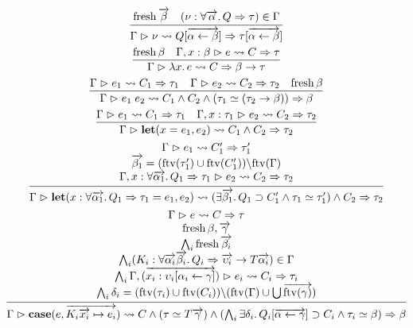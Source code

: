 \begin{gather*}
  \infer{\Gamma \vrhd \nu \elab Q[\overrightarrow{\alpha \assign \beta}] \Rightarrow \tau[\overrightarrow{\alpha \assign \beta}]}{
    \symfresh \overrightarrow{\beta}
    &
    (\nu: \forall \overrightarrow{\alpha}\ldotp Q \Rightarrow \tau) \in \Gamma
  }
  \\
  \infer{\Gamma \vrhd \lambda x\ldotp e \elab C \Rightarrow \beta \to \tau}{
    \symfresh \beta
    &
    \Gamma,x:\beta \vrhd e \elab C \Rightarrow \tau
  }
  \\
  \infer{\Gamma \vrhd e_1\; e_2 \elab C_1 \land C_2 \land (\tau_1 \simeq (\tau_2 \to \beta)) \Rightarrow \beta}{
    \Gamma \vrhd e_1 \elab C_1 \Rightarrow \tau_1
    &
    \Gamma \vrhd e_2 \elab C_2 \Rightarrow \tau_2
    &
    \symfresh \beta
  }
  \\
  \infer{\Gamma \vrhd \mathbf{let}(x = e_1, e_2) \elab C_1 \land C_2 \Rightarrow \tau_2}{
    \Gamma \vrhd e_1 \elab C_1 \Rightarrow \tau_1
    &
    \Gamma, x: \tau_1 \vrhd e_2 \elab C_2 \Rightarrow \tau_2
  }
  \\
  \infer{\Gamma \vrhd \mathbf{let}(x: \forall \overrightarrow{\alpha_1}\ldotp Q_1 \Rightarrow \tau_1 = e_1, e_2) \elab (\exists \overrightarrow{\beta_1}\ldotp Q_1 \supset C_1' \land \tau_1 \simeq \tau_1') \land C_2 \Rightarrow \tau_2}{
    \begin{array}{c}
      \Gamma \vrhd e_1 \elab C_1' \Rightarrow \tau_1' \\
      \overrightarrow{\beta_1} = (\mathrm{ftv}(\tau_1') \cup \mathrm{ftv}(C_1')) \backslash \mathrm{ftv}(\Gamma) \\
      \Gamma, x: \forall \overrightarrow{\alpha_1}\ldotp Q_1 \Rightarrow \tau_1 \vrhd e_2 \elab C_2 \Rightarrow \tau_2
    \end{array}
  }
  \\
  \infer{\Gamma \vrhd \mathbf{case}(e, \overrightarrow{K_i \overrightarrow{x_i} \mapsto e_i}) \elab C \land (\tau \simeq T \overrightarrow{\gamma}) \land (\bigwedge_i \exists \delta_i\ldotp Q_i[\overrightarrow{\alpha \assign \gamma}] \supset C_i \land \tau_i \simeq \beta) \Rightarrow \beta}{
    \begin{array}{c}
      \Gamma \vrhd e \elab C \Rightarrow \tau \\
      \symfresh \beta, \overrightarrow{\gamma} \\
      \bigwedge_i \symfresh \overrightarrow{\beta_i} \\
      \bigwedge_i (K_i: \forall \overrightarrow{\alpha_i}\overrightarrow{\beta_i}\ldotp Q_i \Rightarrow \overrightarrow{\upsilon_i} \to T \overrightarrow{\alpha_i}) \in \Gamma \\
      \bigwedge_i \Gamma, (\overrightarrow{x_i: \upsilon_i[\alpha_i \assign \gamma]}) \vrhd e_i \elab C_i \Rightarrow \tau_i \\
      \bigwedge_i \delta_i = (\mathrm{ftv}(\tau_i) \cup \mathrm{ftv}(C_i)) \backslash (\mathrm{ftv}(\Gamma) \cup \bigcup \overrightarrow{\mathrm{ftv}(\gamma)})
    \end{array}
  }
\end{gather*}

